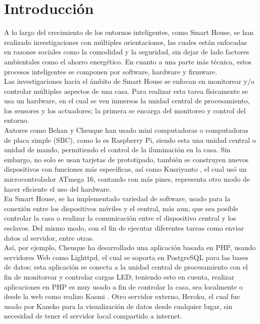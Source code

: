 \chapter{Introducción}

 A lo largo del crecimiento de los entornos inteligentes, como Smart House, se han realizado investigaciones con múltiples orientaciones, las cuales están enfocadas en razones sociales como la comodidad y la seguridad, sin dejar de lado factores ambientales como el ahorro energético. En cuanto a una parte más técnica, estos procesos inteligentes se componen por software, hardware y firmware.\\
 
 Las investigaciones hacia el ámbito de Smart House se enfocan en monitorear y/o controlar múltiples aspectos de una casa. Para realizar esta tarea físicamente se usa un hardware, en el cual se ven inmersos la unidad central de procesamiento, los sensores y los actuadores; la primera se encarga del monitoreo y control del entorno.\\
 
 Autores como Behan \cite{Behan2013} y Cheuque \cite{Cheuque2015} han usado mini computadoras o computadoras de placa simple (SBC), como lo es Raspberry Pi, siendo esta una unidad central o unidad de mando, permitiendo el control de la iluminación en la casa. Sin embargo, no solo se usan tarjetas de prototipado, también se construyen nuevos dispositivos con funciones más específicas, así como Kusriyanto \cite{Kusriyanto2015}, el cual usó un microcontrolador ATmega 16, contando con más pines, representa otro modo de hacer eficiente el uso del hardware.\\
 
 En Smart House, se ha implementado variedad de software, usado para la conexión entre los dispositivos móviles y el central, más aun, que sea posible controlar la casa o realizar la comunicación entre el dispositivo central y los esclavos. Del mismo modo, con el fin de ejecutar diferentes tareas como enviar datos al servidor, entre otras.\\
 
 Así, por ejemplo, Cheuque \cite{Cheuque2015} ha desarrollado una aplicación basada en PHP, usando servidores Web como Lighttpd, el cual se soporta en PostgreSQL para las bases de datos; esta aplicación se conecta a la unidad central de procesamiento con el fin de monitorear y controlar cargas LED; teniendo esto en cuenta, realizar aplicaciones en PHP es muy usado a fin de controlar la casa, sea localmente o desde la web como realizo Kasmi \cite{Kasmi2016}. Otro servidor externo, Heroku, el cual fue usado por Kaneko \cite{Kaneko2017} para la visualización de datos desde cualquier lugar, sin necesidad de tener el servidor local compartido a internet.\\
 
